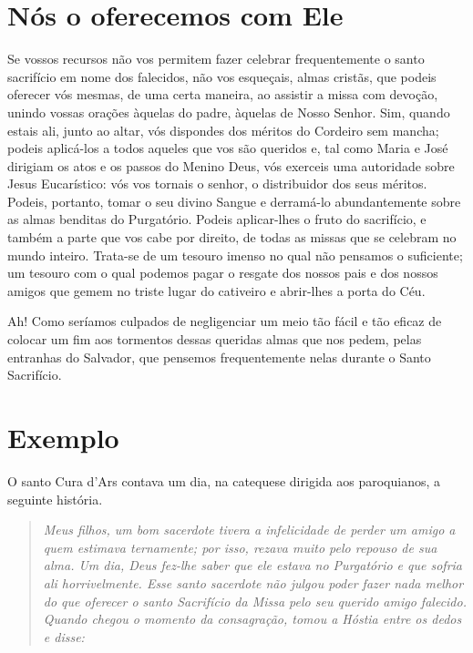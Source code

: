 \section*{Nós o oferecemos com Ele}

Se vossos recursos não vos permitem fazer celebrar frequentemente o santo sacrifício em nome dos falecidos, não vos esqueçais, almas cristãs, que podeis oferecer vós mesmas, de uma certa maneira, ao assistir a missa com devoção, unindo vossas orações àquelas do padre, àquelas de Nosso Senhor. Sim, quando estais ali, junto ao altar, vós dispondes dos méritos do Cordeiro sem mancha; podeis aplicá-los a todos aqueles que vos são queridos e, tal como Maria e José dirigiam os atos e os passos do Menino Deus, vós exerceis uma autoridade sobre Jesus Eucarístico: vós vos tornais o senhor, o distribuidor dos seus méritos. Podeis, portanto, tomar o seu divino Sangue e derramá-lo abundantemente sobre as almas benditas do Purgatório. Podeis aplicar-lhes o fruto do sacrifício, e também a parte que vos cabe por direito, de todas as missas que se celebram no mundo inteiro. Trata-se de um tesouro imenso no qual não pensamos o suficiente; um tesouro com o qual podemos pagar o resgate dos nossos pais e dos nossos amigos que gemem no triste lugar do cativeiro e abrir-lhes a porta do Céu. 

Ah! Como seríamos culpados de negligenciar um meio tão fácil e tão eficaz de colocar um fim aos tormentos dessas queridas almas que nos pedem, pelas entranhas do Salvador, que pensemos frequentemente nelas durante o Santo Sacrifício.


\section*{Exemplo }

O santo Cura d’Ars contava um dia, na catequese dirigida aos paroquianos, a seguinte história. 

\begin{quote}
\textit{\textit{Meus filhos, um bom sacerdote tivera a infelicidade de perder um amigo a quem estimava ternamente; por isso, rezava muito pelo repouso de sua alma. Um dia, Deus fez-lhe saber que ele estava no Purgatório e que sofria ali horrivelmente. Esse santo sacerdote não julgou poder fazer nada melhor do que oferecer o santo Sacrifício da Missa pelo seu querido amigo falecido. Quando chegou o momento da consagração, tomou a Hóstia entre os dedos e disse:}}
\end{quote}

